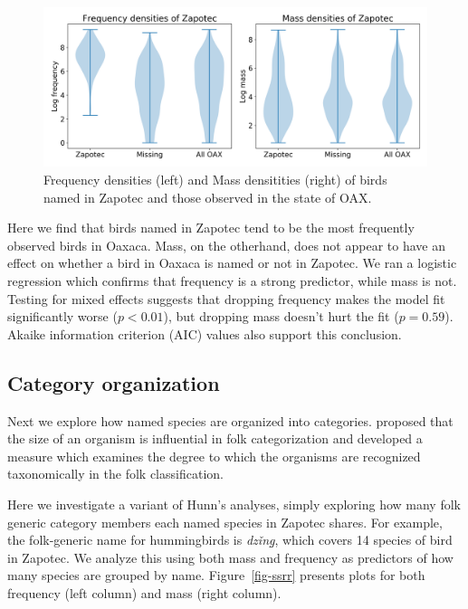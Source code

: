 \documentclass[10pt,letterpaper]{article}
\begin{document}
\begin{figure}[hbt!]
  \begin{center}
    \includegraphics[width=.95\textwidth]{./figures/birdfreqmass-violinplots.png}
        \caption{Frequency densities (left) and Mass densitities (right) of birds named in Zapotec and those observed in the state of OAX.}
        \label{fig-birdfreqmassviolin}
  \end{center}
\end{figure}

Here we find that birds named in Zapotec tend to be the most frequently observed birds in Oaxaca. Mass, on the otherhand, does not appear to have an effect on whether a bird in Oaxaca is named or not in Zapotec. We ran a logistic regression which confirms that frequency is a strong predictor, while mass is not. Testing for mixed effects suggests that dropping frequency makes the model fit significantly worse ($p < 0.01$), but dropping mass doesn’t hurt the fit ($p = 0.59$). Akaike information criterion (AIC) values also support this conclusion. 



\subsection{Category organization}

Next we explore how named species are organized into categories.  proposed that the size of an organism is influential in folk categorization and developed a measure which examines the degree to which the organisms are recognized taxonomically in the folk classification. 

Here we investigate a variant of Hunn's analyses, simply exploring how many folk generic category members each named species in Zapotec shares. For example, the folk-generic name for hummingbirds is \textit{dz\v{i}n\b{g}}, which covers 14 species of bird in Zapotec. We analyze this using both mass and frequency as predictors of how many species are grouped by name. Figure~\ref{fig-ssrr} presents plots for both frequency (left column) and mass (right column).
\end{document}
